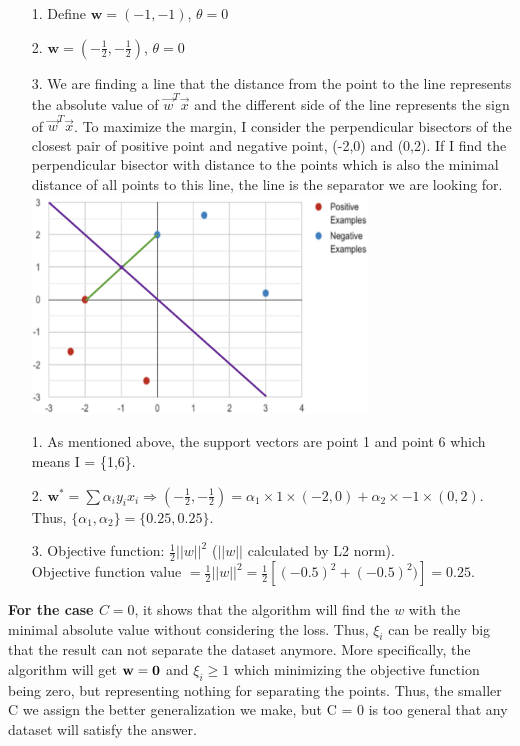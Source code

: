 \item[(a)]

\begin{itemize}
\item[1.]
Define $\mathbf{w}= (-1,-1)$, $\theta = 0$ 
\item[2.]
$\mathbf{w} = (-\frac{1}{2},-\frac{1}{2})$, $\theta = 0$ 
\item[3.]
We are finding a line that the distance from the point to the line represents the absolute value of $\vec{w}^T\vec{x}$ and the different side of the line represents the sign of $\vec{w}^T\vec{x}$. To maximize the margin, I consider the perpendicular bisectors of the closest pair of positive point and negative point, (-2,0) and (0,2). If I find the perpendicular bisector with distance to the points which is also the minimal distance of all points to this line, the line is the separator we are looking for.
\\\includegraphics[width = 0.7\textwidth]{fig2.png}\\
\end{itemize}
\item[(b)]
\begin{itemize}
\item[1.]
As mentioned above, the support vectors are point 1 and point 6 which means I = \{1,6\}.
\item[2.]
 $\mathbf{w}^{*} = \sum \alpha_i y_i x_i \Rightarrow (-\frac{1}{2},-\frac{1}{2}) =\alpha_1\times 1 \times(-2,0)+\alpha_2\times -1\times(0,2) $.\\ Thus, $\{\alpha_1, \alpha_2\}=\{0.25,0.25\}$.  
\item[3.]
Objective function: $\frac{1}{2}||w||^2$ ($||w||$ calculated by L2 norm).\\
Objective function value $=\frac{1}{2}||w||^2 = \frac{1}{2} [(-0.5)^2+(-0.5)^2)] = 0.25 $.
\end{itemize} 
\item[(c)]
\textbf{For the case $C = 0$}, it shows that the algorithm will find the $w$ with the minimal absolute value without considering the loss. Thus, $\xi_i$ can be really big that the result can not separate the dataset anymore. More specifically, the algorithm will get ${\bf w} = {\bf 0}$ and $\xi_{i} \ge 1$ which minimizing the objective function being zero, but representing nothing for separating the points. Thus, the smaller C we assign the better generalization we make, but C = 0 is too general that any dataset will satisfy the answer. \\
